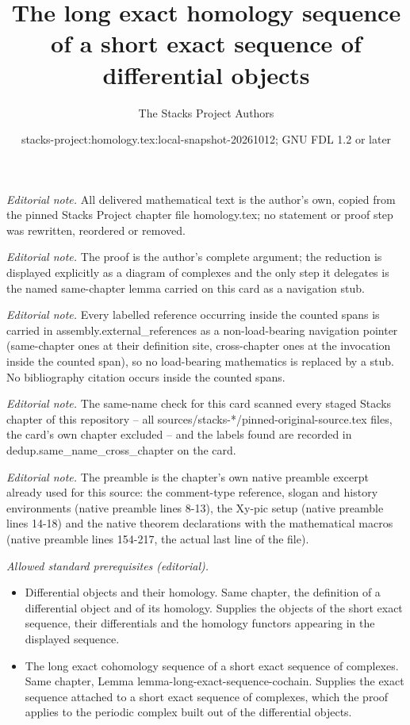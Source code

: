 \documentclass[10pt,a4paper]{amsart}
\title{The long exact homology sequence of a short exact sequence of differential objects}
\author{The Stacks Project Authors}
\date{stacks-project:homology.tex:local-snapshot-20261012; GNU FDL 1.2 or later}
\theoremstyle{plain}
\theoremstyle{definition}
\theoremstyle{remark}
\numberwithin{equation}{subsection}
\begin{document}
\maketitle
\noindent\textit{Editorial note.} All delivered mathematical text is the author's own, copied from the pinned Stacks Project chapter file homology.tex; no statement or proof step was rewritten, reordered or removed.\par\medskip
\noindent\textit{Editorial note.} The proof is the author's complete argument; the reduction is displayed explicitly as a diagram of complexes and the only step it delegates is the named same-chapter lemma carried on this card as a navigation stub.\par\medskip
\noindent\textit{Editorial note.} Every labelled reference occurring inside the counted spans is carried in assembly.external\_references as a non-load-bearing navigation pointer (same-chapter ones at their definition site, cross-chapter ones at the invocation inside the counted span), so no load-bearing mathematics is replaced by a stub. No bibliography citation occurs inside the counted spans.\par\medskip
\noindent\textit{Editorial note.} The same-name check for this card scanned every staged Stacks chapter of this repository -- all sources/stacks-*/pinned-original-source.tex files, the card's own chapter excluded -- and the labels found are recorded in dedup.same\_name\_cross\_chapter on the card.\par\medskip
\noindent\textit{Editorial note.} The preamble is the chapter's own native preamble excerpt already used for this source: the comment-type reference, slogan and history environments (native preamble lines 8-13), the Xy-pic setup (native preamble lines 14-18) and the native theorem declarations with the mathematical macros (native preamble lines 154-217, the actual last line of the file).\par\medskip
\noindent\textit{Allowed standard prerequisites (editorial).}\begin{itemize}
\item Differential objects and their homology. Same chapter, the definition of a differential object and of its homology. Supplies the objects of the short exact sequence, their differentials and the homology functors appearing in the displayed sequence.
\item The long exact cohomology sequence of a short exact sequence of complexes. Same chapter, Lemma lemma-long-exact-sequence-cochain. Supplies the exact sequence attached to a short exact sequence of complexes, which the proof applies to the periodic complex built out of the differential objects.
\end{itemize}\medskip
\end{document}
